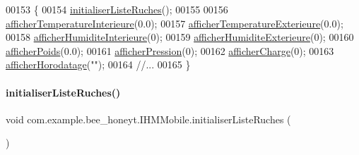 \begin{DoxyCode}
00153     \{
00154         \hyperlink{classcom_1_1example_1_1bee__honeyt_1_1_i_h_m_mobile_a1fb171bee5ff2ce052ad88fb9bc84718}{initialiserListeRuches}();
00155 
00156         \hyperlink{classcom_1_1example_1_1bee__honeyt_1_1_i_h_m_mobile_ac0f55897a183a0887c87954f6fbfdf2f}{afficherTemperatureInterieure}(0.0);
00157         \hyperlink{classcom_1_1example_1_1bee__honeyt_1_1_i_h_m_mobile_af7ce50e9cc663c2c9198bbbb2b7882ff}{afficherTemperatureExterieure}(0.0);
00158         \hyperlink{classcom_1_1example_1_1bee__honeyt_1_1_i_h_m_mobile_ae59dbfdcd0be7d98bb714398931028b5}{afficherHumiditeInterieure}(0);
00159         \hyperlink{classcom_1_1example_1_1bee__honeyt_1_1_i_h_m_mobile_a8571df97f453ee83c35d653b06127691}{afficherHumiditeExterieure}(0);
00160         \hyperlink{classcom_1_1example_1_1bee__honeyt_1_1_i_h_m_mobile_a2f4fe6cded3a35b0152e43d546be5565}{afficherPoids}(0.0);
00161         \hyperlink{classcom_1_1example_1_1bee__honeyt_1_1_i_h_m_mobile_a92bb00501214f2f5f9805a005f1ecdaa}{afficherPression}(0);
00162         \hyperlink{classcom_1_1example_1_1bee__honeyt_1_1_i_h_m_mobile_a64c55ee927d9cb31265989d0296edc53}{afficherCharge}(0);
00163         \hyperlink{classcom_1_1example_1_1bee__honeyt_1_1_i_h_m_mobile_ae1a488c4774eea0b794257f576ab932d}{afficherHorodatage}(\textcolor{stringliteral}{""});
00164         \textcolor{comment}{//...}
00165     \}
\end{DoxyCode}
\mbox{\label{classcom_1_1example_1_1bee__honeyt_1_1_i_h_m_mobile_a1fb171bee5ff2ce052ad88fb9bc84718}} 
\paragraph{\texorpdfstring{initialiser\+Liste\+Ruches()}{initialiserListeRuches()}}
{\footnotesize\ttfamily void com.\+example.\+bee\+\_\+honeyt.\+I\+H\+M\+Mobile.\+initialiser\+Liste\+Ruches (\begin{DoxyParamCaption}{ }\end{DoxyParamCaption})\hspace{0.3cm}{\ttfamily [private]}}



